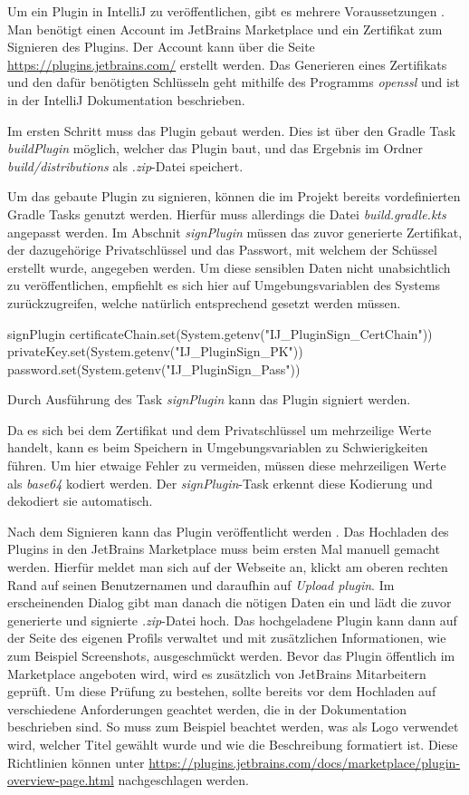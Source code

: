 Um ein Plugin in IntelliJ zu veröffentlichen, gibt es mehrere Voraussetzungen
\cite{IntelliJPlatformSDKPluginSigning}.
Man benötigt einen Account im JetBrains Marketplace und ein Zertifikat
zum Signieren des Plugins. Der Account kann über die Seite 
\url{https://plugins.jetbrains.com/} erstellt werden. Das Generieren eines
Zertifikats und den dafür benötigten Schlüsseln geht mithilfe des 
Programms \emph{openssl} und ist in der IntelliJ Dokumentation beschrieben.

Im ersten Schritt muss das Plugin gebaut werden. Dies ist über den
Gradle Task \emph{buildPlugin} möglich, welcher das Plugin baut, und
das Ergebnis im Ordner \emph{build/distributions} als \emph{.zip}-Datei
speichert.

Um das gebaute Plugin zu signieren, können die im Projekt bereits vordefinierten
Gradle Tasks genutzt werden. Hierfür muss allerdings die Datei 
\emph{build.gradle.kts} angepasst werden. Im Abschnit \emph{signPlugin}
müssen das zuvor generierte Zertifikat, der dazugehörige Privatschlüssel
und das Passwort, mit welchem der Schüssel erstellt wurde, angegeben werden.
Um diese sensiblen Daten nicht unabsichtlich zu veröffentlichen, empfiehlt
es sich hier auf Umgebungsvariablen des Systems zurückzugreifen, welche
natürlich entsprechend gesetzt werden müssen.
\begin{JsCode}[numbers=none]
    signPlugin {
        certificateChain.set(System.getenv("IJ_PluginSign_CertChain"))
        privateKey.set(System.getenv("IJ_PluginSign_PK"))
        password.set(System.getenv("IJ_PluginSign_Pass"))
    }
\end{JsCode}
Durch Ausführung des Task \emph{signPlugin} kann das Plugin signiert werden. 

Da es sich bei dem Zertifikat und dem Privatschlüssel um mehrzeilige
Werte handelt, kann es beim Speichern in Umgebungsvariablen
zu Schwierigkeiten führen.
Um hier etwaige Fehler zu vermeiden, müssen diese mehrzeiligen
Werte als \emph{base64} kodiert werden. Der \emph{signPlugin}-Task
erkennt diese Kodierung und dekodiert sie automatisch.

Nach dem Signieren kann das Plugin veröffentlicht werden
\cite{IntelliJPlatformSDKPublishingAPlugin}.
Das Hochladen des Plugins in den JetBrains Marketplace muss beim ersten Mal
manuell gemacht werden. Hierfür meldet man sich auf der Webseite an,
klickt am oberen rechten Rand auf seinen Benutzernamen und daraufhin
auf \emph{Upload plugin}. Im erscheinenden Dialog gibt man
danach die nötigen Daten ein und lädt die zuvor generierte und signierte
\emph{.zip}-Datei hoch.
Das hochgeladene Plugin kann dann auf der Seite des eigenen Profils
verwaltet und mit zusätzlichen Informationen, wie zum Beispiel Screenshots,
ausgeschmückt werden.
Bevor das Plugin öffentlich im Marketplace angeboten wird, wird es 
zusätzlich von JetBrains Mitarbeitern geprüft. Um diese Prüfung
zu bestehen, sollte bereits vor dem Hochladen auf verschiedene
Anforderungen geachtet werden, die in der Dokumentation beschrieben sind.
So muss zum Beispiel beachtet werden, was als Logo verwendet wird, welcher
Titel gewählt wurde und wie die Beschreibung formatiert ist.
Diese Richtlinien können unter \url{https://plugins.jetbrains.com/docs/marketplace/plugin-overview-page.html}
nachgeschlagen werden.


